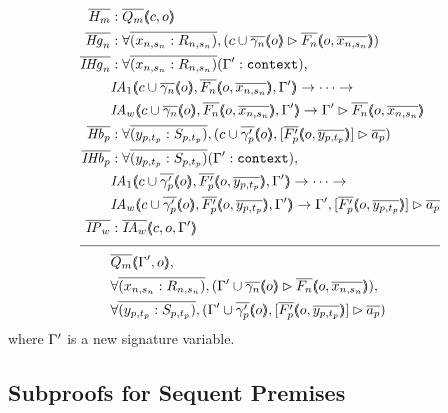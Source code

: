\begin{align*}
\ol{H_m} &: \ol{Q_m} \args{c , o} \\
\ol{\mathit{Hg}_n} &: \forall \ol{(x_{n,s_n} : R_{n,s_n})}, (\seqsl[c \cup \ol{\gamma_n} \args{o}]{\ol{F_n} \args{o , \ol{x_{n,s_n}}})} \\
\ol{\mathit{IHg}_n} &: \forall \ol{(x_{n,s_n} : R_{n,s_n})} (\inddyncon{} : \sltm{context}), \\
& \mathit{IA}_1 \args{c \cup \ol{\gamma_n} \args{o} , \ol{F_n} \args{o , \ol{x_{n,s_n}}} , \inddyncon{}} \rightarrow \dots \rightarrow \\
& \mathit{IA}_w \args{c \cup \ol{\gamma_n} \args{o} , \ol{F_n} \args{o , \ol{x_{n,s_n}}} , \inddyncon{}} \rightarrow \seqsl[\inddyncon{}]{\ol{F_n} \args{o , \ol{x_{n,s_n}}}} \\
\ol{\mathit{Hb}_p} &: \forall \ol{(y_{p,t_p} : S_{p,t_p})}, (\bchsl[c \cup \ol{\gamma'_p} \args{o}]{\ol{F'_p} \args{o , \ol{y_{p,t_p}}}}{\ol{a_p}}) \\
\ol{\mathit{IHb}_p} &: \forall \ol{(y_{p,t_p} : S_{p,t_p})} (\inddyncon{} : \sltm{context}), \\
& \mathit{IA}_1 \args{c \cup \ol{\gamma'_p} \args{o} , \ol{F'_p} \args{o , \ol{y_{p,t_p}}} , \inddyncon{}} \rightarrow \dots \rightarrow \\
& \mathit{IA}_w \args{c \cup \ol{\gamma'_p} \args{o} , \ol{F'_p} \args{o , \ol{y_{p,t_p}}} , \inddyncon{}} \rightarrow \bchsl[\inddyncon{}]{\ol{F'_p} \args{o , \ol{y_{p,t_p}}}}{\ol{a_p}} \\
\ol{\mathit{IP}_w} &: \ol{\mathit{IA}_w} \args{c , o , \inddyncon{}} \\[\pfshift{}]
\cline{1-2}
& \ol{Q_m} \args{\inddyncon{} , o}, \\
& \forall \ol{(x_{n,s_n} : R_{n,s_n})}, (\seqsl[\inddyncon{} \cup \ol{\gamma_n} \args{o}]{\ol{F_n} \args{o , \ol{x_{n,s_n}}}}), \\
& \forall \ol{(y_{p,t_p} : S_{p,t_p})}, (\bchsl[\inddyncon{} \cup \ol{\gamma'_p} \args{o}]{\ol{F'_p} \args{o , \ol{y_{p,t_p}}}}{\ol{a_p}})
\end{align*}
where $\Gamma'{}$ is a new signature variable.

\subsection{Subproofs for Sequent Premises}


